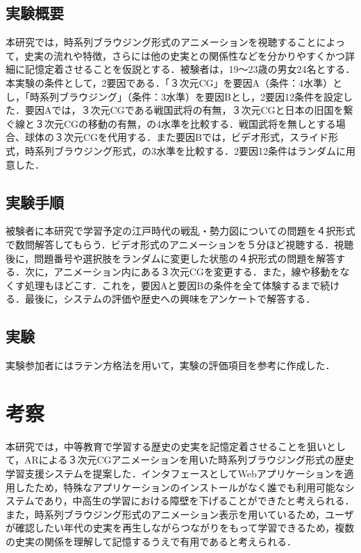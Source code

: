 \documentclass[a4paper,dvipdfmx]{hisken}
\begin{document}
\subsection{実験概要}
本研究では，時系列ブラウジング形式のアニメーションを視聴することによって，史実の流れや特徴，さらには他の史実との関係性などを分かりやすくかつ詳細に記憶定着させることを仮説とする．被験者は，19〜23歳の男女24名とする．本実験の条件として，2要因である．「３次元CG」を要因A（条件：4水準）とし，「時系列ブラウジング」（条件：3水準）を要因Bとし，2要因12条件を設定した．要因Aでは，３次元CGである戦国武将の有無，３次元CGと日本の旧国を繋ぐ線と３次元CGの移動の有無，の4水準を比較する．戦国武将を無しとする場合、球体の３次元CGを代用する．また要因Bでは，ビデオ形式，スライド形式，時系列ブラウジング形式，の3水準を比較する．2要因12条件はランダムに用意した．

\subsection{実験手順}
被験者に本研究で学習予定の江戸時代の戦乱・勢力図についての問題を４択形式で数問解答してもらう．ビデオ形式のアニメーションを５分ほど視聴する．視聴後に，問題番号や選択肢をランダムに変更した状態の４択形式の問題を解答する．次に，アニメーション内にある３次元CGを変更する．また，線や移動をなくす処理もほどこす．これを，要因Aと要因Bの条件を全て体験するまで続ける．最後に，システムの評価や歴史への興味をアンケートで解答する．


\subsection{実験}
実験参加者にはラテン方格法を用いて，実験の評価項目を参考に作成した．



\section{考察}

本研究では，中等教育で学習する歴史の史実を記憶定着させることを狙いとして，ARによる３次元CGアニメーションを用いた時系列ブラウジング形式の歴史学習支援システムを提案した．インタフェースとしてWebアプリケーションを適用したため，特殊なアプリケーションのインストールがなく誰でも利用可能なシステムであり，中高生の学習における障壁を下げることができたと考えられる．また，時系列ブラウジング形式のアニメーション表示を用いているため，ユーザが確認したい年代の史実を再生しながらつながりをもって学習できるため，複数の史実の関係を理解して記憶するうえで有用であると考えられる．
\end{document}
